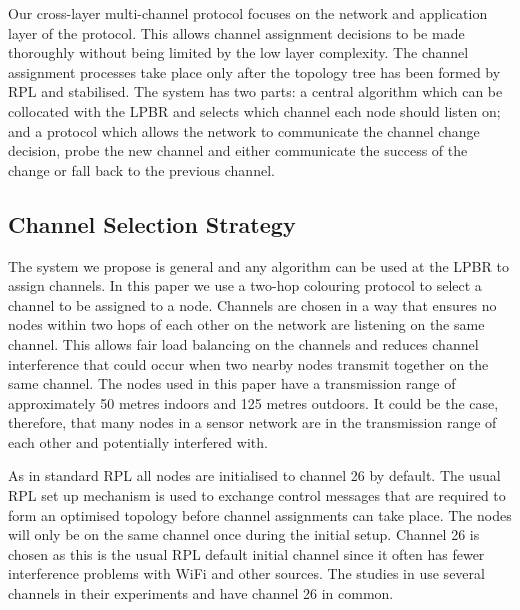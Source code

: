 Our cross-layer multi-channel protocol focuses on the network and application layer of the protocol. This allows channel assignment decisions to be made thoroughly without being limited by the low layer complexity. The channel assignment processes take place only after the topology tree has been formed by RPL and stabilised. The system
has two parts: a central algorithm which can be collocated with the LPBR and selects which channel each node should listen on; and a protocol which allows the network to communicate the channel change decision, probe the new channel and either communicate the success of the change or fall back to the previous channel. 



\subsection{Channel Selection Strategy}

The system we propose is general and any algorithm can be used at the LPBR to assign channels. In this paper we
use a two-hop colouring protocol to select a channel to be assigned to a node. Channels are chosen in a way that
ensures no nodes within two hops of each other on the network are listening on the same channel.
This allows fair load balancing on the channels and reduces channel interference that could occur when two nearby nodes transmit together on the same channel. The nodes used in this paper have a transmission range of approximately 50 metres indoors and 125 metres outdoors. It could be the case, therefore, that many nodes in a sensor network are in the transmission range of each other and potentially interfered with.

As in standard RPL all nodes are initialised to channel 26 by default. The usual RPL set up mechanism is used to exchange control messages that are required to form an optimised topology before channel assignments can take place. The nodes will only be on the same channel once during the initial setup. Channel 26 is chosen as this is the usual RPL default initial channel since it often has fewer interference problems with WiFi and other sources. The studies in \cite{chrysso}\cite{micmac}\cite{watteyne} use several channels in their experiments and have channel 26 in common.
	
